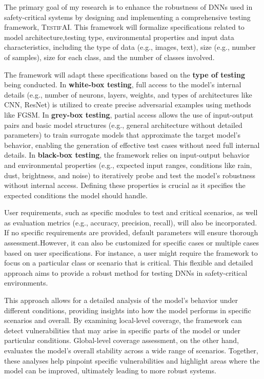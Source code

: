 The primary goal of my research is to enhance the robustness of DNNs used in safety-critical systems by designing and implementing a comprehensive testing framework, \textsc{TestifAI}. This framework will formalize specifications related to model architecture,testing type, environmental properties and input data characteristics, including the type of data (e.g., images, text), size (e.g., number of samples), size for each class, and the number of classes involved.

 The framework will adapt these specifications based on the \textbf{type of testing} being conducted. In \textbf{white-box testing}, full access to the model's internal details (e.g., number of neurons, layers, weights, and types of architectures like CNN, ResNet) is utilized to create precise adversarial examples using methods like FGSM. In \textbf{grey-box testing}, partial access allows the use of input-output pairs and basic model structures (e.g., general architecture without detailed parameters) to train surrogate models that approximate the target model's behavior, enabling the generation of effective test cases without need full internal details. In \textbf{black-box testing}, the framework relies on input-output behavior and environmental properties (e.g., expected input ranges, conditions like rain, dust, brightness, and noise) to iteratively probe and test the model's robustness without internal access. Defining these properties is crucial as it specifies the expected conditions the model should handle.

User requirements, such as specific modules to test and critical scenarios, as well as evaluation metrics (e.g., accuracy, precision, recall), will also be incorporated. If no specific requirements are provided, default parameters will ensure thorough assessment.However, it can also be customized for specific cases or multiple cases based on user specifications. For instance, a user might require the framework to focus on a particular class or scenario that is critical. This flexible and detailed approach aims to provide a robust method for testing DNNs in safety-critical environments.


 This approach allows for a detailed analysis of the model's behavior under different conditions, providing insights into how the model performs in specific scenarios and overall. By examining local-level coverage, the framework can detect vulnerabilities that may arise in specific parts of the model or under particular conditions. Global-level coverage assessment, on the other hand, evaluates the model's overall stability across a wide range of scenarios. Together, these analyses help pinpoint specific vulnerabilities and highlight areas where the model can be improved, ultimately leading to more robust systems.

